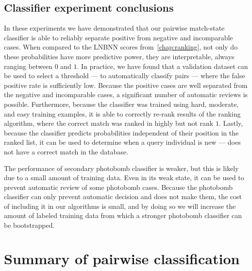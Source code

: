     \FloatBarrier{}
    \subsection{Classifier experiment conclusions}
        In these experiments we have demonstrated that our pairwise match-state classifier is able to reliably
          separate positive from negative and incomparable cases.
        When compared to the LNBNN scores from~\cref{chap:ranking}, not only do these probabilities have more
          predictive power, they are interpretable, always ranging between $0$ and $1$.
        In practice, we have found that a validation dataset can be used to select a threshold --- to
          automatically classify pairs --- where the false positive rate is sufficiently low.
        Because the positive cases are well separated from the negative and incomparable cases, a significant
          number of automatic reviews is possible.
        Furthermore, because the classifier was trained using hard, moderate, and easy training examples, it is
          able to correctly re-rank results of the ranking algorithm, where the correct match was ranked in highly
          but not rank $1$.
        Lastly, because the classifier predicts probabilities independent of their position in the ranked list,
          it can be used to determine when a query individual is new --- \ie{} does not have a correct match in the
          database.

        The performance of secondary photobomb classifier is weaker, but this is likely due to a small amount of
          training data.
        Even in its weak state, it can be used to prevent automatic review of some photobomb cases.
        Because the photobomb classifier can only prevent automatic decision and does not make them, the cost of
          including it in our algorithms is small, and by doing so we will increase the amount of labeled training
          data from which a stronger photobomb classifier can be bootstrapped.


\section{Summary of pairwise classification}\label{sec:pairconclusion}

